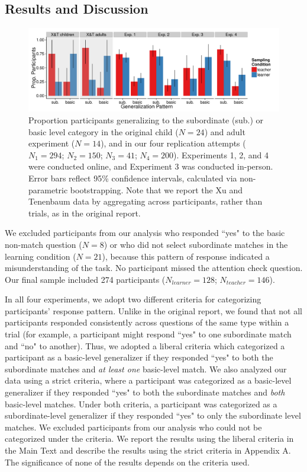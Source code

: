 \documentclass[man]{apa2}
\begin{document}
\subsection{Results and Discussion}
 \begin{figure} [t]
 \begin{center} 
  \includegraphics[width=6.5in]{figures/FIG_2.pdf} 
  \caption{\label{fig:bar_plots} Proportion participants generalizing to the subordinate (sub.) or basic level category in the original child ($N = 24$) and adult experiment ($N = 14$), and in our four replication attempts ($N_{1} = 294$; $N_{2} = 150$; $N_{3}  = 41$; $N_{4}  = 200$).  Experiments 1, 2, and 4 were conducted online, and Experiment 3 was conducted in-person. Error bars reflect 95\% confidence intervals, calculated via non-parametric bootstrapping. Note that we report the Xu and Tenenbaum data by aggregating across participants, rather than trials, as in the original report.} 
 \end{center} 
\end{figure}

We excluded participants from our analysis who responded ``yes" to the basic non-match question ($N=8$) or who did not select subordinate matches in the learning condition ($N = 21$), because this pattern of response indicated a misunderstanding of the task. No participant missed the attention check question. Our final sample  included 274 participants ($N_{learner} = 128$; $N_{teacher} = 146$).

In all four experiments, we adopt two different criteria for categorizing participants' response pattern. Unlike in the original report, we found that not all participants responded consistently across questions of the same type within a trial (for example, a participant might respond ``yes" to one subordinate match and ``no" to another). Thus, we adopted a liberal criteria which categorized a participant as a basic-level generalizer if they responded ``yes" to both the subordinate matches and {\it at least one} basic-level match. We also analyzed our data using a strict criteria, where a participant was categorized as a basic-level generalizer if they responded ``yes" to both the subordinate matches and {\it both} basic-level matches.  Under both criteria, a participant was categorized as a subordinate-level generalizer if they responded ``yes" to only the subordinate level matches.  We excluded participants from our analysis who could not be categorized under the criteria. We report the results using the liberal criteria in the Main Text and describe the results using the strict criteria in Appendix A. The significance  of none of the results depends on the criteria used. 
\end{document}
